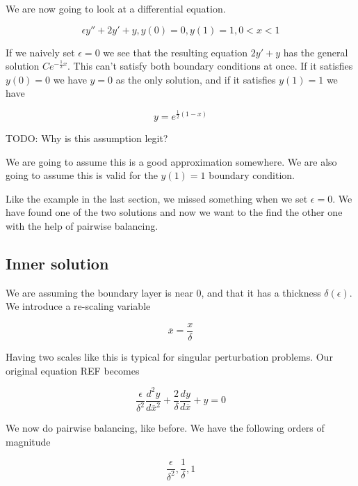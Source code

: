 \documentclass[12pt]{article}
\begin{document}
We are now going to look at a differential equation.

\begin{equation}
\epsilon y'' + 2 y' + y, y(0)=0, y(1)=1, 0 < x < 1
\end{equation}

If we naively set $\epsilon = 0$ we see that the resulting equation $2 y' + y$
has the general solution $C e^{- \frac{1}{2}x}$. This can't satisfy both
boundary conditions at once. If it satisfies $y(0)=0$ we have $y=0$ as the only
solution, and if it satisfies $y(1)=1$ we have

\begin{equation}
y=e^{\frac{1}{2} (1 - x)}
\end{equation}

TODO: Why is this assumption legit?

We are going to assume this is a good approximation somewhere. We are also going
to assume this is valid for the $y(1)=1$ boundary condition.

Like the example in the last section, we missed something when we set $\epsilon
= 0$. We have found one of the two solutions and now we want to the find the
other one with the help of pairwise balancing.

\subsection{Inner solution}

We are assuming the boundary layer is near 0, and that it has a thickness
$\delta(\epsilon)$. We introduce a re-scaling variable

\begin{equation}
\overline{x} = \frac{x}{\delta}
\end{equation}

Having two scales like this is typical for singular perturbation problems. Our
original equation REF becomes

\begin{equation}
\frac{\epsilon}{\delta^2} \frac{d^2y}{d\overline{x}^2} + \frac{2}{\delta}
\frac{dy}{d\overline{x}} + y = 0
\end{equation}

We now do pairwise balancing, like before. We have the following orders of
magnitude

\begin{equation}
\frac{\epsilon}{\delta^2}, \frac{1}{\delta}, 1
\end{equation}
\end{document}
